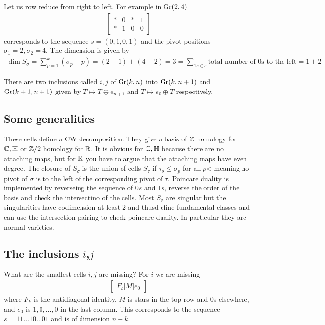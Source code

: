 \documentclass[12pt]{article}
\begin{document}
\begin{example}
    Let us row reduce from right to left. For example in $\operatorname{Gr}(2,4)$ \begin{align*}
        \begin{bmatrix}
            * & 0 & * & 1 \\
            * & 1 & 0 & 0
        \end{bmatrix}
    \end{align*}
    corresponds to the sequence $s = (0,1,0,1)$ and the pivot positions $\sigma_1 = 2, \sigma_2 = 4$. The dimension is given by \begin{align*}
        \dim S_\sigma = \sum_{p=1}^k (\sigma_p - p) = (2-1) + (4-2) = 3 = \sum_{1s \in s} \text{total number of 0s to the left} = 1 + 2
    \end{align*}
\end{example}

There are two inclusions called $i,j$ of $\operatorname{Gr}(k,n)$ into $\operatorname{Gr}(k,n+1)$ and $\operatorname{Gr}(k+1,n+1)$ given by $T \mapsto T\oplus e_{n+1}$ and $T \mapsto e_0 \oplus T$ respectively. 

\subsection{Some generalities}
These cells define a CW decomposition. They give a basis of $\mathbb{Z}$ homology for $\mathbb{C},\mathbb{H}$ or $\mathbb{Z}/2$ homology for $\mathbb{R}$. It is obvious for $\mathbb{C},\mathbb{H}$ because there are no attaching maps, but for $\mathbb{R}$ you have to argue that the attaching maps have even degree. The closure of $S_{\sigma}$ is the union of cells $S_{\tau}$ if $\tau_p \leq \sigma_p$ for all $p$< meaning no pivot of $\sigma$ is to the left of the corresponding pivot of $\tau$. Poincare duality is implemented by reverseing the sequence of $0s$ and $1s$, reverse the order of the basis and check the intersectino of the cells. Most $\overline{S_\sigma}$ are singular but the singularities have codimension at least $2$ and thusd efine fundamental classes and can use the intersection pairing to check poincare duality. In particular they are normal varieties.

\subsection{The inclusions $i$,$j$}
What are the smallest cells $i,j$ are missing?
For $i$ we are missing \begin{align*}
    \begin{bmatrix}
        F_k \vert M \vert e_0
    \end{bmatrix} 
\end{align*} where $F_k$ is the antidiagonal identity, $M$ is stars in the top row and 0s elsewhere, and $e_0$ is $1,0,\dots,0$ in the last column. This corresponds to the sequence $s = 11\dots10\dots01$ and is of dimension $n-k$.
\end{document}
